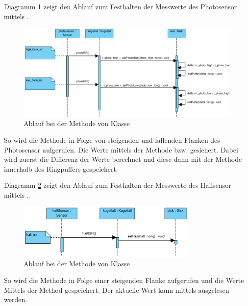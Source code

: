 Diagramm \ref{fig:photoISR} zeigt den Ablauf zum Festhalten der Messwerte des Photosensor mittels . 
\begin{figure}[htbp]
	\centering
	\includegraphics[width=\textwidth]{abb/photoISR_cropped}
	\caption{Ablauf bei der Methode  von Klasse }
	\label{fig:photoISR}
\end{figure}
So wird die  Methode  in Folge von steigenden und fallenden Flanken des Photosensor aufgerufen.
Die Werte mittels der Methode  bzw.  gesichert.
Dabei wird zuerst die Differenz der Werte berechnet und diese dann mit der Methode  innerhalb des Ringpuffers gespeichert.


Diagramm \ref{fig:hallISR} zeigt den Ablauf zum Festhalten der Messwerte des Hallsensor mittels .
\begin{figure}[htbp]
	\centering
	\includegraphics[width=0.8\textwidth]{abb/hallISR_cropped}
	\caption{Ablauf bei der Methode  von Klasse }
	\label{fig:hallISR}
\end{figure}
So wird die Methode  in Folge einer steigenden Flanke aufgerufen und die Werte Mittels der Method  gespeichert.
Der aktuelle Wert kann mittels  ausgelesen werden.